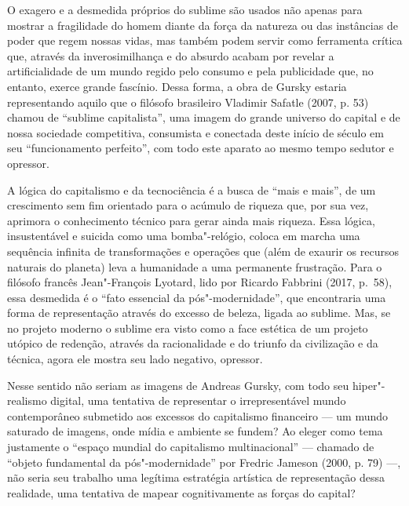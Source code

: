 O exagero e a desmedida próprios do sublime são usados não apenas para
mostrar a fragilidade do homem diante da força da natureza ou das
instâncias de poder que regem nossas vidas, mas também podem servir como
ferramenta crítica que, através da inverosimilhança e do absurdo acabam
por revelar a artificialidade de um mundo regido pelo consumo e pela
publicidade que, no entanto, exerce grande fascínio. Dessa forma, a obra
de Gursky estaria representando aquilo que o filósofo brasileiro
Vladimir Safatle (2007, p. 53) chamou de ``sublime capitalista'', uma
imagem do grande universo do capital e de nossa sociedade competitiva,
consumista e conectada deste início de século  em seu ``funcionamento
perfeito'', com todo este aparato ao mesmo tempo sedutor e opressor.

A lógica do capitalismo e da tecnociência é a busca de ``mais e mais'', de
um crescimento sem fim orientado para o acúmulo de riqueza que, por sua
vez, aprimora o conhecimento técnico para gerar ainda mais riqueza. Essa
lógica, insustentável e suicida como uma bomba"-relógio, coloca em marcha
uma sequência infinita de transformações e operações que (além de
exaurir os recursos naturais do planeta) leva a humanidade a uma
permanente frustração. Para o filósofo francês Jean"-François Lyotard,
lido por Ricardo Fabbrini (2017, p.~58), essa desmedida é o ``fato
essencial da pós"-modernidade'', que encontraria uma forma de
representação através do excesso de beleza, ligada ao sublime. Mas, se
no projeto moderno o sublime era visto como a face estética de um
projeto utópico de redenção, através da racionalidade e do triunfo da
civilização e da técnica, agora ele mostra seu lado negativo, opressor.

Nesse sentido não seriam as imagens de Andreas Gursky, com todo seu
hiper"-realismo digital, uma tentativa de representar o irrepresentável
mundo contemporâneo submetido aos excessos do capitalismo financeiro ---
um mundo saturado de imagens, onde mídia e ambiente se fundem? Ao eleger
como tema justamente o ``espaço mundial do capitalismo multinacional''
--- chamado de ``objeto fundamental da pós"-modernidade'' por Fredric
Jameson (2000, p. 79) ---, não seria seu trabalho uma legítima
estratégia artística de representação dessa realidade, uma tentativa de
mapear cognitivamente as forças do capital?

